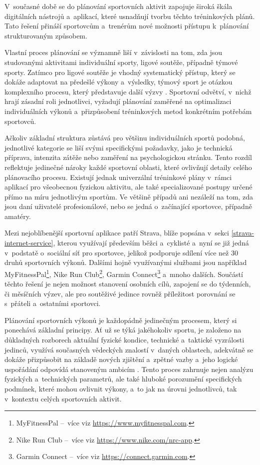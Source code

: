 V~současné době se do plánování sportovních aktivit zapojuje široká škála digitálních nástrojů a~aplikací, které usnadňují tvorbu těchto tréninkových plánů.
Tato řešení přináší sportovcům a~trenérům nové možnosti přístupu k~plánování strukturovaným způsobem.

Vlastní proces plánování se významně liší v~závislosti na tom, zda jsou studovanými aktivitami individuální sporty, ligové soutěže, případně týmové sporty.
Zatímco pro ligové soutěže je vhodný systematický přístup, který se dokáže adaptovat na předešlé výkony a~výsledky, týmový sport je otázkou komplexního procesu, který představuje další výzvy \cite{LyleJohn2010}.
Sportovní odvětví, v~nichž hrají zásadní roli jednotlivci, vyžadují plánování zaměřené na optimalizaci individuálních výkonů a~přizpůsobení tréninkových metod konkrétním potřebám sportovců.

Ačkoliv základní struktura zůstává pro většinu individuálních sportů podobná, jednotlivé kategorie se liší svými specifickými požadavky, jako je technická příprava, intenzita zátěže nebo zaměření na psychologickou stránku.
Tento rozdíl reflektuje jedinečné nároky každé sportovní oblasti, které ovlivňují detaily celého plánovacího procesu.
Existují jednak univerzální tréninkové plány v~rámci aplikací pro všeobecnou fyzickou aktivitu, ale také specializované postupy určené přímo na míru jednotlivým sportům.
Ve většině případů ani nezáleží na tom, zda jsou daní uživatelé profesionálové, nebo se jedná o~začínající sportovce, případně amatéry.

Mezi nejoblíbenější sportovní aplikace patří Strava, blíže popsána v~sekci \ref{strava-internet-service}, kterou využívají především běžci a~cyklisté a~nyní se již jedná v~podstatě o~sociální síť pro sportovce, jelikož podporuje sdílení více než 30 druhů sportovních výkonů.
Dalšími hojně využívanými službami jsou například MyFitnessPal\footnote{MyFitnessPal --~více viz \url{https://www.myfitnesspal.com}.}, Nike Run Club\footnote{Nike Run Club --~více viz \url{https://www.nike.com/nrc-app}.}, Garmin Connect\footnote{Garmin Connect --~více viz \url{https://connect.garmin.com}.} a~mnoho dalších.
Součástí těchto řešení je nejen možnost stanovení osobních cílů, zapojení se do týdenních, či měsíčních výzev, ale pro soutěživé jedince rovněž příležitost porovnání se s~přáteli a~ostatními sportovci.

Plánování sportovních výkonů je každopádně jedinečným procesem, který si ponechává základní principy.
Ať už se týká jakéhokoliv sportu, je založeno na důkladných rozborech aktuální fyzické kondice, technické a~taktické vyzrálosti jedinců, využívá současných vědeckých znalostí v~daných oblastech, adekvátně se dokáže přizpůsobit na základě nových zjištění a~zpětné vazby a~jeho logické uspořádání odpovídá stanoveným ambicím \cite{ManilalKPDr2021}.
Tento proces zahrnuje nejen analýzu fyzických a~technických parametrů, ale také hluboké porozumění specifických podmínek, které mohou ovlivnit výkony, a~to jak na úrovni jednotlivců, tak v~kontextu celých sportovních aktivit.

